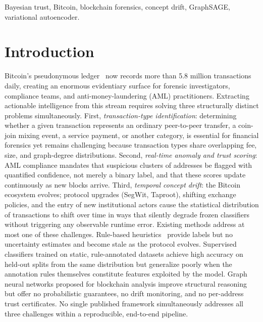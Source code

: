 \documentclass[journal]{IEEEtran}
\begin{document}
\begin{IEEEkeywords}
Bayesian trust, Bitcoin, blockchain forensics, concept drift, GraphSAGE,
variational autoencoder.
\end{IEEEkeywords}

\section{Introduction}
\label{sec:introduction}

Bitcoin's pseudonymous ledger~\cite{Dudani2023} now records more than
\num{5.8} million transactions daily, creating an enormous evidentiary surface
for forensic investigators, compliance teams, and anti-money-laundering (AML)
practitioners.
Extracting actionable intelligence from this stream requires solving three
structurally distinct problems simultaneously.
First, \emph{transaction-type identification}: determining whether a given
transaction represents an ordinary peer-to-peer transfer, a coin-join mixing
event, a service payment, or another category, is essential for financial
forensics yet remains challenging because transaction types share overlapping
fee, size, and graph-degree distributions.
Second, \emph{real-time anomaly and trust scoring}: AML compliance mandates
that suspicious clusters of addresses be flagged with quantified confidence,
not merely a binary label, and that these scores update continuously as new
blocks arrive.
Third, \emph{temporal concept drift}: the Bitcoin ecosystem evolves; protocol
upgrades (SegWit, Taproot), shifting exchange policies, and the entry of new
institutional actors cause the statistical distribution of transactions to
shift over time in ways that silently degrade frozen classifiers without
triggering any observable runtime error.
Existing methods address at most one of these challenges.
Rule-based heuristics~\cite{Chang2025} provide labels but no uncertainty
estimates and become stale as the protocol evolves.
Supervised classifiers trained on static, rule-annotated datasets achieve
high accuracy on held-out splits from the same distribution but generalize
poorly when the annotation rules themselves constitute features exploited by
the model.
Graph neural networks proposed for blockchain analysis
\cite{Pareja2020,Tan2023} improve structural reasoning but offer no
probabilistic guarantees, no drift monitoring, and no per-address trust
certificates.
No single published framework simultaneously addresses all three challenges
within a reproducible, end-to-end pipeline.
\end{document}
